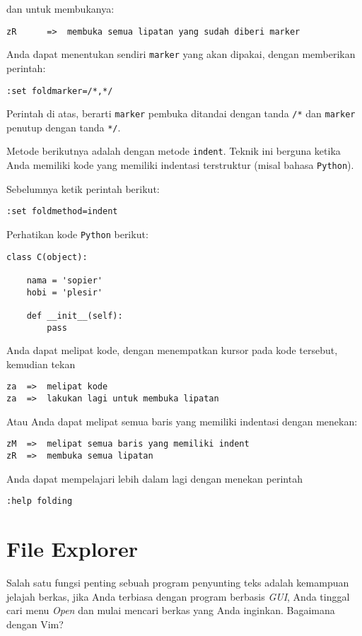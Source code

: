 \documentclass{article}
\begin{document}
dan untuk membukanya:

\begin{verbatim}
zR      =>  membuka semua lipatan yang sudah diberi marker
\end{verbatim}

Anda dapat menentukan sendiri \verb=marker= yang akan
dipakai, dengan memberikan perintah:

\begin{verbatim}
:set foldmarker=/*,*/
\end{verbatim}

Perintah di atas, berarti \verb=marker= pembuka ditandai
dengan tanda \verb=/*= dan \verb=marker= penutup dengan
tanda \verb=*/=.

Metode berikutnya adalah dengan metode \verb=indent=. Teknik
ini berguna ketika Anda memiliki kode yang memiliki
indentasi terstruktur (misal bahasa \verb=Python=).

Sebelumnya ketik perintah berikut:

\begin{verbatim}
:set foldmethod=indent
\end{verbatim}

Perhatikan kode \verb=Python= berikut:

\begin{verbatim}
class C(object):

    nama = 'sopier'
    hobi = 'plesir'

    def __init__(self):
        pass
\end{verbatim}

Anda dapat melipat kode, dengan menempatkan kursor pada kode
tersebut, kemudian tekan

\begin{verbatim}
za  =>  melipat kode
za  =>  lakukan lagi untuk membuka lipatan
\end{verbatim}

Atau Anda dapat melipat semua baris yang memiliki indentasi
dengan menekan:

\begin{verbatim}
zM  =>  melipat semua baris yang memiliki indent
zR  =>  membuka semua lipatan
\end{verbatim}

Anda dapat mempelajari lebih dalam lagi dengan menekan
perintah 

\begin{verbatim}
:help folding
\end{verbatim}

\section{File Explorer}
Salah satu fungsi penting sebuah program penyunting teks
adalah kemampuan jelajah berkas, jika Anda terbiasa dengan
program berbasis \emph{GUI}, Anda tinggal cari menu
\emph{Open} dan mulai mencari berkas yang Anda inginkan.
Bagaimana dengan Vim?
\end{document}
